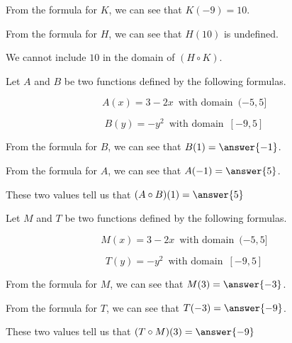 \documentclass{ximera}
\begin{document}
\begin{example}

From the formula for $K$, we can see that $K(-9) = 10$.

From the formula for $H$, we can see that $H(10)$ is undefined.

We cannot include $10$ in the domain of $(H \circ K)$.

\end{example}










\begin{question}




Let $A$ and $B$ be two functions defined by the following formulas.

\[
A(x) = 3 - 2x \,  \text{ with domain }  \,  (-5, 5]
\]


\[
B(y) = -y^2 \,  \text{ with domain }  \,  [-9, 5]
\]




From the formula for $B$, we can see that $B(1) = \answer{-1}$.

From the formula for $A$, we can see that $A(-1) = \answer{5}$.

These two values tell us that $(A \circ B)(1) = \answer{5}$

\end{question}








\begin{question}




Let $M$ and $T$ be two functions defined by the following formulas.

\[
M(x) = 3 - 2x \,  \text{ with domain }  \,  (-5, 5]
\]


\[
T(y) = -y^2 \,  \text{ with domain }  \,  [-9, 5]
\]





From the formula for $M$, we can see that $M(3) = \answer{-3}$.

From the formula for $T$, we can see that $T(-3) = \answer{-9}$.

These two values tell us that $(T \circ M)(3) = \answer{-9}$

\end{question}
\end{document}
